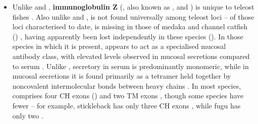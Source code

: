 \begin{itemize}
\item Unlike  and , \textbf{immunoglobulin Z} (, also known as ,  and ) is unique to teleost fishes \parencite{fillatreau2013astonishing}. Also unlike  and ,  is not found universally among teleost loci -- of those \igh{} loci characterised to date,  is missing in those of medaka and channel catfish ()  \parencite{fillatreau2013astonishing,magadan2011medaka}, having apparently been lost independently in these species (). In those species in which it is present,  appears to act as a specialised mucosal antibody class, with elevated levels observed in mucosal secretions compared to serum \parencite{zhang2010igtgut,fillatreau2013astonishing,xu2013igtskin}. Unlike , secretory  in serum is predominantly monomeric, while in mucosal secretions it is found primarily as a tetramer held together by noncovalent intermolecular bonds between heavy chains \parencite{zhang2010igtgut}. In most species,  comprises four CH exons () and two TM exons \parencite{mashoof2016immunoglobulins}, though some species have fewer -- for example, stickleback  has only three CH exons \parencite{bao2010stickleback,gambondeza2011stickleback}, while fugu  has only two \parencite{fillatreau2013astonishing,savan2005fugu}.
\end{itemize}


